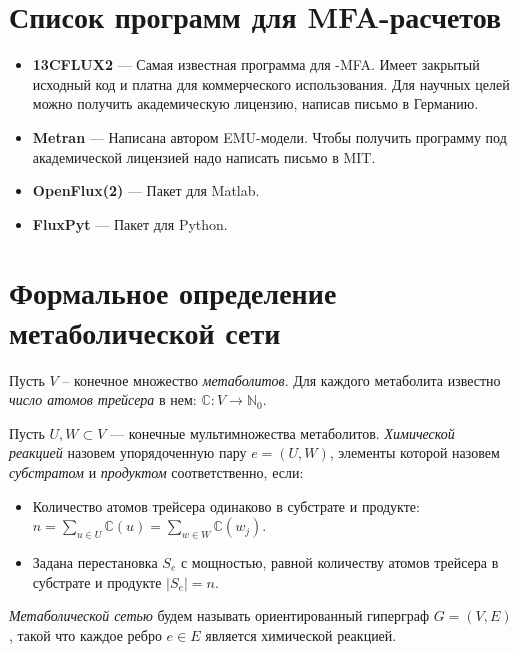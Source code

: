 \documentclass[14pt, a4paper]{extreport}
\begin{document}
\begin{appendices}
	\chapter{Список программ для MFA-расчетов}
	\begin{itemize}
		\item \textbf{13CFLUX2} --- Самая известная программа для -MFA. Имеет закрытый исходный код и платна для коммерческого использования. Для научных целей можно получить академическую лицензию, написав письмо в Германию\cite{13CFLUX2}.
		
		\item \textbf{Metran} --- Написана автором EMU-модели. Чтобы получить программу под академической лицензией надо написать письмо в MIT\cite{Metran}.
		
		\item \textbf{OpenFlux(2)} --- Пакет для Matlab\cite{OpenFlux, OpenFlux2}.
		
		\item \textbf{FluxPyt} --- Пакет для Python\cite{FluxPyt}.
	\end{itemize}
	
	
	\chapter{Формальное определение \\метаболической сети}
	Пусть $V$ -- конечное множество \emph{метаболитов}. Для каждого метаболита известно \emph{число атомов трейсера} в нем: $\mathbb{C} \colon V \to \mathbb{N}_0$. 
	
	Пусть $U, W \subset V$ --- конечные мультимножества метаболитов. \emph{Химической реакцией} назовем упорядоченную пару $e = (U, W)$, элементы которой назовем \emph{субстратом} и \emph{продуктом} соответственно, если:
	\begin{itemize}
		\item Количество атомов трейсера одинаково в субстрате и продукте: \\ $n = \sum_{u \in U} \mathbb{C}(u) = \sum_{w \in W} \mathbb{C}(w_j)$. 
		\item Задана перестановка $S_e$ с мощностью, равной количеству атомов трейсера в субстрате и продукте $|S_e| = n$.
	\end{itemize}
	
	\emph{Метаболической сетью} будем называть ориентированный гиперграф $G = (V, E)$, такой что каждое ребро $e \in E$ является химической реакцией.
\end{appendices}
\end{document}
